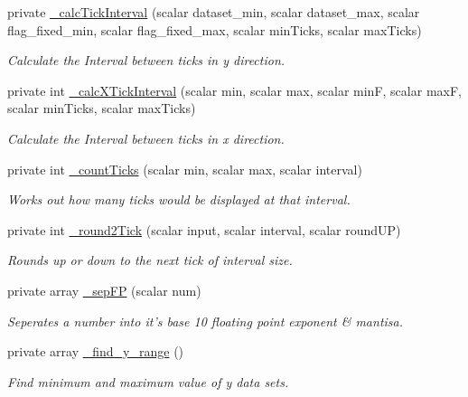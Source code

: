 \begin{DoxyCompactItemize}
private \hyperlink{classChart_1_1Base_a23f7394cb8c7bbe6a5d0e05582e038c9}{\_\-calcTickInterval} (scalar dataset\_\-min, scalar dataset\_\-max, scalar flag\_\-fixed\_\-min, scalar flag\_\-fixed\_\-max, scalar minTicks, scalar maxTicks)
\begin{DoxyCompactList}\small\item\em Calculate the Interval between ticks in y direction. \item\end{DoxyCompactList}\item 
private int \hyperlink{classChart_1_1Base_abc810d13339a6b0ab2f08ff8a96b82cb}{\_\-calcXTickInterval} (scalar min, scalar max, scalar minF, scalar maxF, scalar minTicks, scalar maxTicks)
\begin{DoxyCompactList}\small\item\em Calculate the Interval between ticks in x direction. \item\end{DoxyCompactList}\item 
private int \hyperlink{classChart_1_1Base_afb289639a7016adabc1cb03ae7851269}{\_\-countTicks} (scalar min, scalar max, scalar interval)
\begin{DoxyCompactList}\small\item\em Works out how many ticks would be displayed at that interval. \item\end{DoxyCompactList}\item 
private int \hyperlink{classChart_1_1Base_afaa4e9e29bc7fb9df56e9c7cd168e79b}{\_\-round2Tick} (scalar input, scalar interval, scalar roundUP)
\begin{DoxyCompactList}\small\item\em Rounds up or down to the next tick of interval size. \item\end{DoxyCompactList}\item 
private array \hyperlink{classChart_1_1Base_ab1f985ad443c2f1d1bf3ef86e9382346}{\_\-sepFP} (scalar num)
\begin{DoxyCompactList}\small\item\em Seperates a number into it's base 10 floating point exponent \& mantisa. \item\end{DoxyCompactList}\item 
private array \hyperlink{classChart_1_1Base_ad28e18fc86eebc6846785580977532ca}{\_\-find\_\-y\_\-range} ()
\begin{DoxyCompactList}\small\item\em Find minimum and maximum value of y data sets. \item\end{DoxyCompactList}\item 

\end{DoxyCompactItemize}
